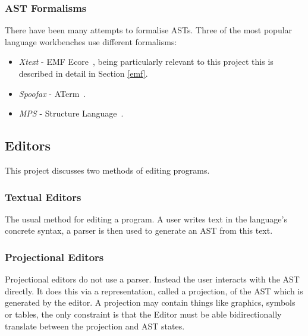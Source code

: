 \documentclass{article}
\begin{document}
\subsubsection{AST Formalisms}\label{astFormalisms}
There have been many attempts to formalise ASTs. Three of the most popular language workbenches use different formalisms: \begin{itemize}
\item \emph{Xtext} - EMF Ecore~\cite{emf}, being particularly relevant to this project this is described in detail in Section \ref{emf}.
\item \emph{Spoofax} - ATerm~\cite{aterm}.
\item \emph{MPS} - Structure Language~\cite{mpsStructureLanguage}.
\end{itemize}
%
\subsection{Editors}
This project discusses two methods of editing programs.
\subsubsection{Textual Editors}
The usual method for editing a program. A user writes text in the language's concrete syntax, a parser is then used to generate an AST from this text.
\subsubsection{Projectional Editors}
Projectional editors do not use a parser. Instead the user interacts with the AST directly. It does this via a representation, called a projection, of the AST which is generated by the editor. A projection may contain things like graphics, symbols or tables, the only constraint is that the Editor must be able bidirectionally translate between the projection and AST states. 

\end{document}
